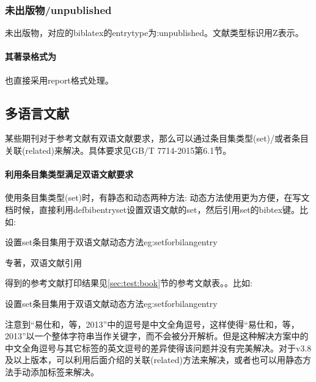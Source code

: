 \subsubsection{未出版物/unpublished}
\begin{refentry}{}{}
未出版物，对应的biblatex的entrytype为:unpublished。文献类型标识用Z表示。

\paragraph{其著录格式为} 也直接采用report格式处理。
\end{refentry}

\subsection{多语言文献}\label{sec:multilan:implement}

某些期刊对于参考文献有双语文献要求，那么可以通过条目集类型(set)/或者条目关联(related)来解决。具体要求见GB/T 7714-2015第6.1节。

\paragraph{利用条目集类型满足双语文献要求}

使用条目集类型(set)时，有静态和动态两种方法:
动态方法使用更为方便，在写文档时候，直接利用defbibentryset设置双语文献的set，然后引用set的bibtex键。比如:
\begin{example}{设置set条目集用于双语文献动态方法}{eg:setforbilangentry}
\begin{texlist}
专著，双语文献引用\cite{bilangyi2013}
\end{texlist}
\end{example}

得到的参考文献打印结果见\ref{sec:test:book}节的参考文献表。。比如:
\begin{example}{设置set条目集用于双语文献动态方法}{eg:setforbilangentry}
\end{example}
注意到“易仕和，等，2013”中的逗号是中文全角逗号，这样使得“易仕和，等，2013”以一个整体字符串当作关键字，而不会被分开解析。但是这种解决方案中的中文全角逗号与其它标签的英文逗号的差异使得该问题并没有完美解决。对于v3.8及以上版本，可以利用后面介绍的关联(related)方法来解决，或者也可以用静态方法手动添加标签来解决。

